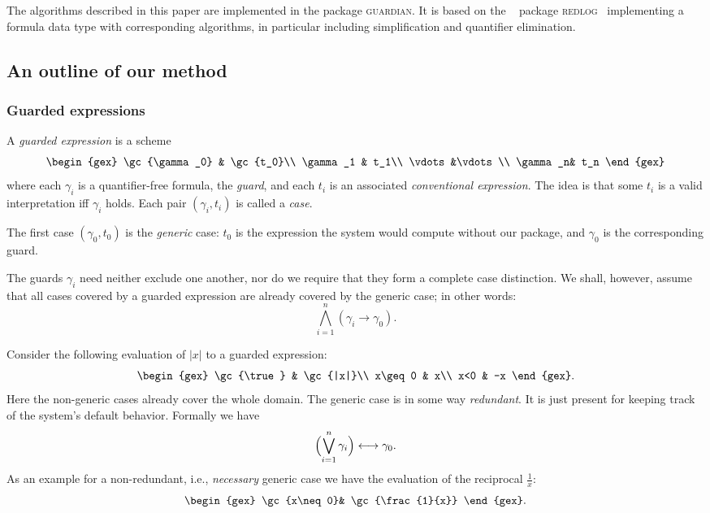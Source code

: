 The algorithms described in this paper are implemented in the
\REDUCE package \textsc{guardian}. It is based on the
\REDUCE~\cite{Hearn:91,Melenk:95} package
\textsc{redlog}~\cite{DolzmannSturm:97a,Dolzmann:96a} implementing a
formula data type with corresponding algorithms, in particular
including simplification and quantifier elimination.

\subsection{An outline of our method}
\subsubsection{Guarded expressions}
A {\em guarded expression} is a scheme
\[
\begin{gex}
\gc{\gamma_0} & \gc{t_0}\\
\gamma_1 & t_1\\
\vdots&\vdots\\
\gamma_n& t_n
\end{gex}
\]
where each $\gamma_i$ is a quantifier-free formula, the {\em guard},
and each $t_i$ is an associated {\em conventional expression}. The
idea is that some $t_i$ is a valid interpretation iff $\gamma_i$
holds. Each pair $(\gamma_i,t_i)$ is called a {\em case}.

The first case $(\gamma_0,t_0)$ is the {\em generic} case: $t_0$ is
the expression the system would compute without our package, and
$\gamma_0$ is the corresponding guard.

The guards $\gamma_i$ need neither exclude one another, nor do we
require that they form a complete case distinction. We shall, however,
assume that all cases covered by a guarded expression are already
covered by the generic case; in other words:
\begin{equation}
\bigwedge_{i=1}^n(\gamma_i\longrightarrow\gamma_0).\label{gencoversall}
\end{equation}

Consider the following evaluation of $|x|$ to a guarded expression:
\[
\begin{gex}
\gc{\true} & \gc{|x|}\\
x\geq0 & x\\
x<0 & -x
\end{gex}.
\]
Here the non-generic cases already cover the whole domain. The
generic case is in some way {\em redundant}. It is just present for
keeping track of the system's default behavior. Formally we have
\begin{equation}
\Bigl(\bigvee_{i=1}^n\gamma_i\Bigr)\longleftrightarrow\gamma_0.
\label{formalredund}
\end{equation}
As an example for a non-redundant, i.e., {\em necessary} generic case
we have the evaluation of the reciprocal $\frac{1}{x}$:
\[
\begin{gex}
\gc{x\neq0}& \gc{\frac{1}{x}}
\end{gex}.
\]

